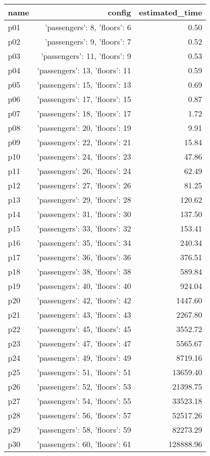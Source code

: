 \documentclass{article}
\begin{document}
                            \begin{center}
                            \scriptsize
                            \begin{tabular}{@{}l|r|r@{}}
                            name & config & estimated\_time\\\midrule
                              p01&{'passengers': 8, 'floors': 6}&0.50\\
  p02&{'passengers': 9, 'floors': 7}&0.52\\
  p03&{'passengers': 11, 'floors': 9}&0.53\\
  p04&{'passengers': 13, 'floors': 11}&0.59\\
  p05&{'passengers': 15, 'floors': 13}&0.69\\
  p06&{'passengers': 17, 'floors': 15}&0.87\\
  p07&{'passengers': 18, 'floors': 17}&1.72\\
  p08&{'passengers': 20, 'floors': 19}&9.91\\
  p09&{'passengers': 22, 'floors': 21}&15.84\\
  p10&{'passengers': 24, 'floors': 23}&47.86\\
  p11&{'passengers': 26, 'floors': 24}&62.49\\
  p12&{'passengers': 27, 'floors': 26}&81.25\\
  p13&{'passengers': 29, 'floors': 28}&120.62\\
  p14&{'passengers': 31, 'floors': 30}&137.50\\
  p15&{'passengers': 33, 'floors': 32}&153.41\\
  p16&{'passengers': 35, 'floors': 34}&240.34\\
  p17&{'passengers': 36, 'floors': 36}&376.51\\
  p18&{'passengers': 38, 'floors': 38}&589.84\\
  p19&{'passengers': 40, 'floors': 40}&924.04\\
  p20&{'passengers': 42, 'floors': 42}&1447.60\\
  p21&{'passengers': 43, 'floors': 43}&2267.80\\
  p22&{'passengers': 45, 'floors': 45}&3552.72\\
  p23&{'passengers': 47, 'floors': 47}&5565.67\\
  p24&{'passengers': 49, 'floors': 49}&8719.16\\
  p25&{'passengers': 51, 'floors': 51}&13659.40\\
  p26&{'passengers': 52, 'floors': 53}&21398.75\\
  p27&{'passengers': 54, 'floors': 55}&33523.18\\
  p28&{'passengers': 56, 'floors': 57}&52517.26\\
  p29&{'passengers': 58, 'floors': 59}&82273.29\\
  p30&{'passengers': 60, 'floors': 61}&128888.96
                            \end{tabular}
                            \end{center}
                    
\end{document}
